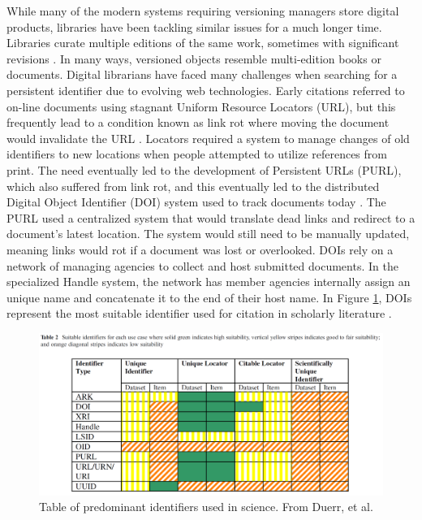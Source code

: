 While many of the modern systems requiring versioning managers store digital products, libraries have been tackling similar issues for a much longer time.
Libraries curate multiple editions of the same work, sometimes with significant revisions \cite{Wiil:2000:RDH:338407.338517}.
In many ways, versioned objects resemble multi-edition books or documents.
Digital librarians have faced many challenges when searching for a persistent identifier due to evolving web technologies.
Early citations referred to on-line documents using stagnant Uniform Resource Locators (URL), but this frequently lead to a condition known as link rot where moving the document would invalidate the URL \cite{Lyons2005}.
Locators required a system to manage changes of old identifiers to new locations when people attempted to utilize references from print.
The need eventually led to the development of Persistent URLs (PURL), which also suffered from link rot, and this eventually led to the distributed Digital Object Identifier (DOI) system used to track documents today \cite{Duerr2011}.
The PURL used a centralized system that would translate dead links and redirect to a document's latest location.
The system would still need to be manually updated, meaning links would rot if a document was lost or overlooked.
DOIs rely on a network of managing agencies to collect and host submitted documents.
In the specialized Handle system, the network has member agencies internally assign an unique name and concatenate it to the end of their host name.
In Figure \ref{table:Duerr}, DOIs represent the most suitable identifier used for citation in scholarly literature \cite{Duerr2011}.
\begin{figure}
	\centering
	\includegraphics[scale=0.28]{figures/DigitalIdentifierTable.png}
	\caption[Table of predominant identifiers used in science.]{Table of predominant identifiers used in science.  From Duerr, et al. \cite{Duerr2011}}
	\label{table:Duerr}
\end{figure}
